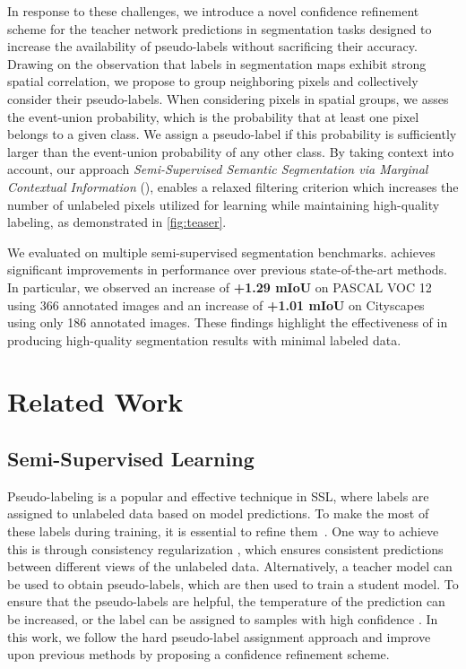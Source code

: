 \documentclass{article}
\renewcommand{\cite}[1]{\citep{#1}}
\begin{document}
In response to these challenges, we introduce a novel confidence refinement scheme for the teacher network predictions in segmentation tasks designed to increase the availability of pseudo-labels without sacrificing their accuracy. Drawing on the observation that labels in segmentation maps exhibit strong spatial correlation, we propose to group neighboring pixels and collectively consider their pseudo-labels.  When considering pixels in spatial groups, we asses the event-union probability, which is the probability that at least one pixel belongs to a given class. We assign a pseudo-label if this probability is sufficiently larger than the event-union probability of any other class. By taking context into account, our approach \emph{Semi-Supervised Semantic Segmentation via Marginal Contextual Information} (\methodname{}), enables a relaxed filtering criterion which increases the number of unlabeled pixels utilized for learning while maintaining high-quality labeling, as demonstrated in \cref{fig:teaser}. 


We evaluated \methodname{} on multiple semi-supervised segmentation benchmarks. \methodname{} achieves significant improvements in performance over previous state-of-the-art methods. In particular, we observed an increase of \textbf{+1.29 mIoU} on PASCAL VOC 12~\cite{voc} using 366 annotated images and an increase of \textbf{+1.01 mIoU} on Cityscapes~\cite{cityscapes} using only 186 annotated images. These findings highlight the effectiveness of \methodname{} in producing high-quality segmentation results with minimal labeled data. \section{Related Work}

\subsection{Semi-Supervised Learning}
Pseudo-labeling \cite{lee2013pseudolabel} is a popular and effective technique in SSL, where labels are assigned to unlabeled data based on model predictions. To make the most of these labels during training, it is essential to refine them~\cite{laine2016temporalensembling, berthelot2019mixmatch,berthelot2019remixmatch,xie2020uda}. One way to achieve this is through consistency regularization \cite{laine2016temporalensembling,tarvainen2017meanteacher, miyato2018vat}, which ensures consistent predictions between different views of the unlabeled data. Alternatively, a teacher model can be used to obtain pseudo-labels, which are then used to train a student model. To ensure that the pseudo-labels are helpful, the temperature of the prediction \citep[soft pseudo-labels;][]{berthelot2019mixmatch} can be increased, or the label can be assigned to samples with high confidence \citep[hard pseudo-labels;][]{xie2020uda,sohn2020fixmatch, zhang2021flexmatch}. In this work, we follow the hard pseudo-label assignment approach and improve upon previous methods by proposing a confidence refinement scheme.
\end{document}
